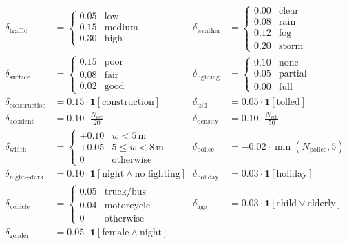 ﻿\documentclass[a4paper, 12pt]{article}
\theoremstyle{remark}
\begin{document}
\begin{align*}
\delta_{\text{traffic}}    &= \begin{cases} 0.05 & \text{low} \\ 0.15 & \text{medium} \\ 0.30 & \text{high} \end{cases} &
\delta_{\text{weather}}    &= \begin{cases} 0.00 & \text{clear} \\ 0.08 & \text{rain} \\ 0.12 & \text{fog} \\ 0.20 & \text{storm} \end{cases} \\[6pt]
\delta_{\text{surface}}    &= \begin{cases} 0.15 & \text{poor} \\ 0.08 & \text{fair} \\ 0.02 & \text{good} \end{cases} &
\delta_{\text{lighting}}   &= \begin{cases} 0.10 & \text{none} \\ 0.05 & \text{partial} \\ 0.00 & \text{full} \end{cases} \\[6pt]
\delta_{\text{construction}} &= 0.15 \cdot \mathbf{1}[\text{construction}] &
\delta_{\text{toll}}       &= 0.05 \cdot \mathbf{1}[\text{tolled}] \\[6pt]
\delta_{\text{accident}}   &= 0.10 \cdot \frac{N_{\text{acc}}}{20} &
\delta_{\text{density}}    &= 0.10 \cdot \frac{N_{\text{veh}}}{50} \\[6pt]
\delta_{\text{width}}      &= \begin{cases} +0.10 & w < 5\,\text{m} \\ +0.05 & 5 \le w < 8\,\text{m} \\ 0 & \text{otherwise} \end{cases} &
\delta_{\text{police}}     &= -0.02 \cdot \min(N_{\text{police}}, 5) \\[6pt]
\delta_{\text{night+dark}} &= 0.10 \cdot \mathbf{1}[\text{night} \wedge \text{no lighting}] &
\delta_{\text{holiday}}    &= 0.03 \cdot \mathbf{1}[\text{holiday}] \\[6pt]
\delta_{\text{vehicle}}    &= \begin{cases} 0.05 & \text{truck/bus} \\ 0.04 & \text{motorcycle} \\ 0 & \text{otherwise} \end{cases} &
\delta_{\text{age}}        &= 0.03 \cdot \mathbf{1}[\text{child} \vee \text{elderly}] \\[6pt]
\delta_{\text{gender}}     &= 0.05 \cdot \mathbf{1}[\text{female} \wedge \text{night}]
\end{align*}
\end{document}
